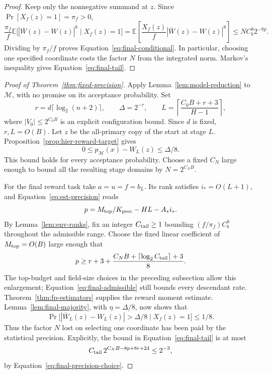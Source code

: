 \begin{proof}
Keep only the nonnegative summand at $z$. Since
$\Pr[X_f(z)=1]=\pi_f>0$,
\[
 \frac{\pi_f}{f}
 \mathbb E\bigl[|\bar W(z)-W(z)|^8\mid X_f(z)=1\bigr]
 =\mathbb E\!\left[\frac{X_f(z)}f|\bar W(z)-W(z)|^8\right]
 \le N C_b^8 2^{-8p}.
\]
Dividing by $\pi_f/f$ proves
Equation~\eqref{eq:final-conditional}. In particular, choosing one
specified coordinate costs the factor $N$ from the integrated norm.
Markov's inequality gives Equation~\eqref{eq:final-tail}.
\end{proof}

\begin{proof}[Proof of Theorem~\ref{thm:fixed-precision}]
Apply Lemma~\ref{lem:model-reduction} to $\mathcal M$, with no promise
on its acceptance probability. Set
\[
 r=d\lceil\log_2(n+2)\rceil,\qquad \Delta=2^{-r},\qquad
 L=\left\lceil\frac{C_0B+r+3}{H-1}\right\rceil,
\]
where $|V_0|\le2^{C_0B}$ is an explicit configuration bound.
Since $d$ is fixed, $r,L=O(B)$. Let $z$ be the all-primary copy of
the start at stage $L$. Proposition~\ref{prop:hier-reward-target}
gives
\begin{equation}\label{eq:final-hierarchy-accuracy}
 0\le p_{\mathcal M}(x)-W_L(z)\le\Delta/8.
\end{equation}
This bound holds for every acceptance probability. Choose a fixed
$C_N$ large enough to bound all the resulting stage domains by
$N=2^{C_NB}$.

For the final reward task take $a=u=f=b_L$. Its rank satisfies
$i_*=O(L+1)$, and Equation~\eqref{eq:est-precision} reads
\[
 p=M_{\rm top}/K_{\rm prec}-HL-A_*i_*.
\]
By Lemma~\ref{lem:env-ranks}, fix an integer $C_{\rm tail}\ge1$ bounding
$(f/\pi_f)C_b^8$ throughout the admissible range. Choose the fixed
linear coefficient of $M_{\rm top}=O(B)$ large enough that
\begin{equation}\label{eq:final-precision-choice}
 p\ge r+3+\frac{C_NB+\lceil\log_2 C_{\rm tail}\rceil+3}{8}.
\end{equation}
The top-budget and field-size choices in the preceding subsection
allow this enlargement; Equation~\eqref{eq:final-admissible} still
bounds every descendant rate. Theorem~\ref{thm:fp-estimators}
supplies the reward moment estimate. Lemma~\ref{lem:final-majority},
with $\eta=\Delta/8$, now shows that
\begin{equation}\label{eq:final-good-environments}
 \Pr\bigl[|\bar W_L(z)-W_L(z)|>\Delta/8
       \mid X_f(z)=1\bigr]\le1/8.
\end{equation}
Thus the factor $N$ lost on selecting one coordinate has been paid
by the statistical precision. Explicitly, the bound in
Equation~\eqref{eq:final-tail} is at most
\[
 C_{\rm tail}\,2^{C_NB-8p+8r+24}\le 2^{-3},
\]
by Equation~\eqref{eq:final-precision-choice}.


\end{proof}
